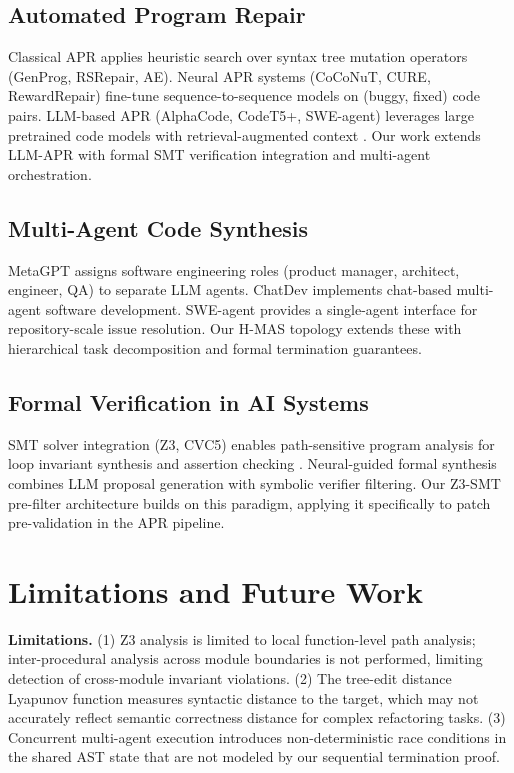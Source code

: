 \documentclass[10pt,twocolumn,letterpaper]{article}
\begin{document}
\subsection{Automated Program Repair}


Classical APR applies heuristic search over syntax tree mutation operators (GenProg, RSRepair, AE). Neural APR systems (CoCoNuT, CURE, RewardRepair) fine-tune sequence-to-sequence models on (buggy, fixed) code pairs. LLM-based APR (AlphaCode, CodeT5+, SWE-agent) leverages large pretrained code models with retrieval-augmented context \cite{arxiv_2405_01543,arxiv_2501_02497}. Our work extends LLM-APR with formal SMT verification integration and multi-agent orchestration.


\subsection{Multi-Agent Code Synthesis}


MetaGPT \cite{crossref_10_48550_arxiv_2308_00352} assigns software engineering roles (product manager, architect, engineer, QA) to separate LLM agents. ChatDev \cite{crossref_10_18653_v1_2024_acl_long_810} implements chat-based multi-agent software development. SWE-agent \cite{crossref_10_48550_arxiv_2405_15793} provides a single-agent interface for repository-scale issue resolution. Our H-MAS topology extends these with hierarchical task decomposition and formal termination guarantees.


\subsection{Formal Verification in AI Systems}


SMT solver integration (Z3, CVC5) enables path-sensitive program analysis for loop invariant synthesis and assertion checking \cite{arxiv_2404_01131}. Neural-guided formal synthesis \cite{crossref_10_18653_v1_2026_findings_acl_1933} combines LLM proposal generation with symbolic verifier filtering. Our Z3-SMT pre-filter architecture builds on this paradigm, applying it specifically to patch pre-validation in the APR pipeline.




\section{Limitations and Future Work}


\textbf{Limitations.} (1) Z3 analysis is limited to local function-level path analysis; inter-procedural analysis across module boundaries is not performed, limiting detection of cross-module invariant violations. (2) The tree-edit distance Lyapunov function measures syntactic distance to the target, which may not accurately reflect semantic correctness distance for complex refactoring tasks. (3) Concurrent multi-agent execution introduces non-deterministic race conditions in the shared AST state that are not modeled by our sequential termination proof.
\end{document}
